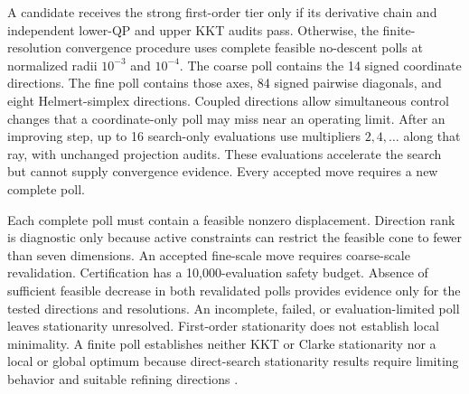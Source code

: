 \documentclass[a4paper,fleqn]{cas-sc}
\begin{document}
A candidate receives the strong first-order tier only if its derivative chain and independent lower-QP and upper KKT audits pass. Otherwise, the finite-resolution convergence procedure uses complete feasible no-descent polls at normalized radii $10^{-3}$ and $10^{-4}$. The coarse poll contains the 14 signed coordinate directions. The fine poll contains those axes, 84 signed pairwise diagonals, and eight Helmert-simplex directions. Coupled directions allow simultaneous control changes that a coordinate-only poll may miss near an operating limit. After an improving step, up to 16 search-only evaluations use multipliers $2,4,\ldots$ along that ray, with unchanged projection audits. These evaluations accelerate the search but cannot supply convergence evidence. Every accepted move requires a new complete poll.

Each complete poll must contain a feasible nonzero displacement. Direction rank is diagnostic only because active constraints can restrict the feasible cone to fewer than seven dimensions. An accepted fine-scale move requires coarse-scale revalidation. Certification has a 10,000-evaluation safety budget. Absence of sufficient feasible decrease in both revalidated polls provides evidence only for the tested directions and resolutions. An incomplete, failed, or evaluation-limited poll leaves stationarity unresolved. First-order stationarity does not establish local minimality. A finite poll establishes neither KKT or Clarke stationarity nor a local or global optimum because direct-search stationarity results require limiting behavior and suitable refining directions \citep{AudetDennis2006}.
\end{document}
